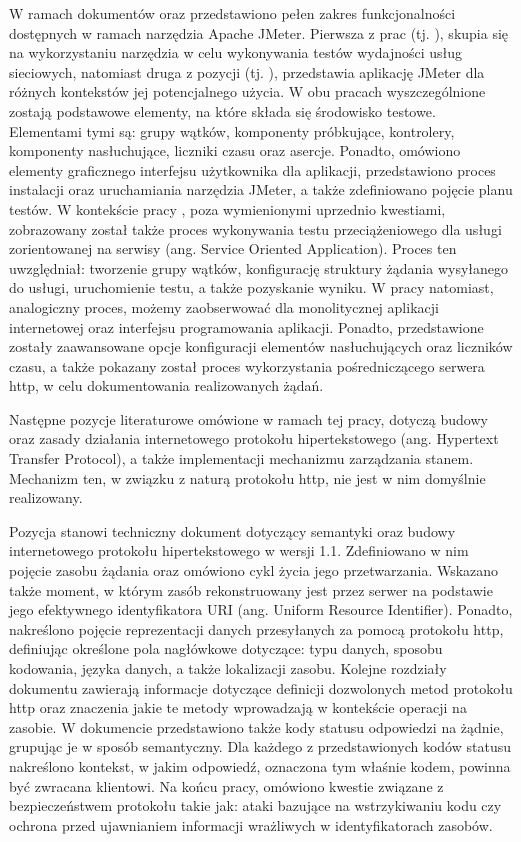 W ramach dokumentów \cite{nevedrov2006using} oraz \cite{halili2008apache} przedstawiono pełen zakres funkcjonalności dostępnych w ramach narzędzia Apache JMeter. Pierwsza z prac (tj. \cite{nevedrov2006using}), skupia się na wykorzystaniu narzędzia w celu wykonywania testów wydajności usług sieciowych, natomiast druga z pozycji (tj. \cite{halili2008apache}), przedstawia aplikację JMeter dla różnych kontekstów jej potencjalnego użycia. W obu pracach wyszczególnione zostają podstawowe elementy, na które składa się środowisko testowe. Elementami tymi są: grupy wątków, komponenty próbkujące, kontrolery, komponenty nasłuchujące, liczniki czasu oraz asercje. Ponadto,  omówiono elementy graficznego interfejsu użytkownika dla aplikacji, przedstawiono proces instalacji oraz uruchamiania narzędzia JMeter, a także zdefiniowano pojęcie planu testów. W kontekście pracy \cite{nevedrov2006using}, poza wymienionymi uprzednio kwestiami, zobrazowany został także proces wykonywania testu przeciążeniowego dla usługi zorientowanej na serwisy (ang. Service Oriented Application). Proces ten uwzględniał: tworzenie grupy wątków, konfigurację struktury żądania wysyłanego do usługi, uruchomienie testu, a także pozyskanie wyniku. W pracy \cite{halili2008apache} natomiast, analogiczny proces, możemy zaobserwować dla monolitycznej aplikacji internetowej oraz interfejsu programowania aplikacji. Ponadto, przedstawione zostały zaawansowane opcje konfiguracji elementów nasłuchujących oraz liczników czasu, a także pokazany został proces wykorzystania pośredniczącego serwera http, w celu dokumentowania realizowanych żądań.

Następne pozycje literaturowe omówione w ramach tej pracy, dotyczą budowy oraz zasady działania internetowego protokołu hipertekstowego (ang. Hypertext Transfer Protocol), a także implementacji mechanizmu zarządzania stanem. Mechanizm ten, w związku z naturą protokołu http, nie jest w nim domyślnie realizowany.

Pozycja \cite{fielding2014hypertext} stanowi techniczny dokument dotyczący semantyki oraz budowy internetowego protokołu hipertekstowego w wersji 1.1. Zdefiniowano w nim pojęcie zasobu żądania oraz omówiono cykl życia jego przetwarzania. Wskazano także moment, w którym zasób rekonstruowany jest przez serwer na podstawie jego efektywnego identyfikatora URI (ang. Uniform Resource Identifier). Ponadto, nakreślono pojęcie reprezentacji danych przesyłanych za pomocą protokołu http, definiując określone pola nagłówkowe dotyczące: typu danych, sposobu kodowania, języka danych, a także lokalizacji zasobu. Kolejne rozdziały dokumentu zawierają informacje dotyczące definicji dozwolonych metod protokołu http oraz znaczenia jakie te metody wprowadzają w kontekście operacji na zasobie. W dokumencie przedstawiono także kody statusu odpowiedzi na żądnie, grupując je w sposób semantyczny. Dla każdego z przedstawionych kodów statusu nakreślono kontekst, w jakim odpowiedź, oznaczona tym właśnie kodem, powinna być zwracana klientowi. Na końcu pracy, omówiono kwestie związane z bezpieczeństwem protokołu takie jak: ataki bazujące na wstrzykiwaniu kodu czy ochrona przed ujawnianiem informacji wrażliwych w identyfikatorach zasobów.

